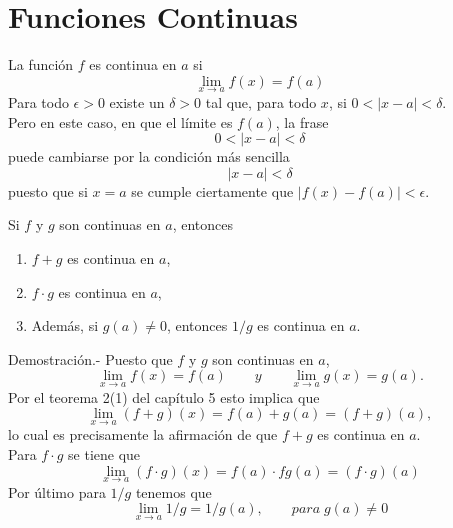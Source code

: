 \chapter{Funciones Continuas}

    \begin{def.} La función $f$ es continua  en $a$ si $$\lim\limits_{x\to a} f(x) = f(a)$$
	Para todo $\epsilon > 0$ existe un $\delta > 0$ tal que, para todo $x$, si $0<|x-a|<\delta$.\\
	Pero en este caso, en que el límite es $f(a)$, la frase $$0<|x-a|<\delta$$
	puede cambiarse por la condición más sencilla $$|x-a|<\delta$$
	puesto que si $x=a$ se cumple ciertamente que $|f(x)-f(a)|<\epsilon$.
    \end{def.}

\begin{teo} Si $f$ y $g$ son continuas en $a$, entonces 
    \begin{center}
	\begin{enumerate}[(1)]
	    \item $f+g$ es continua en $a$,\\
	    \item $f\cdot g$ es continua en $a$,\\
      	    \item Además, si $g(a)\neq 0$, entonces $1/g$ es continua en $a$.\\
	\end{enumerate}
    \end{center}	
    Demostración.-\; Puesto que $f$ y $g$ son continuas en $a$,
    $$\lim_{x\to a}f(x) = f(a) \qquad y \qquad \lim_{x\to a} g(x) = g(a).$$
    Por el teorema 2(1) del capítulo 5 esto implica que 
    $$\lim_{x\to a} (f+g)(x) = f(a)+g(a) = (f+g)(a),$$
    lo cual es precisamente la afirmación de que $f+g$ es continua en $a$.\\
    Para $f\cdot g$ se tiene que $$\lim_{x\to a}(f\cdot g)(x) = f(a)\cdot fg(a) = (f\cdot g)(a)$$
    Por último para $1/g$ tenemos que $$\lim_{x\to a} 1/g = 1/g(a) , \qquad para \; g(a)\neq 0$$\\
\end{teo}

